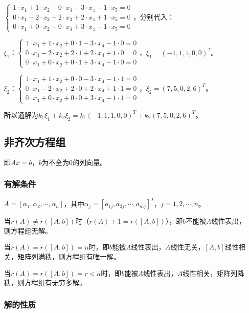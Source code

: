 \documentclass[UTF8, 12pt]{ctexart}
\begin{document}
$\left\{\begin{array}{l}
    1\cdot x_1+1\cdot x_2+0\cdot x_3-3\cdot x_4-1\cdot x_5=0 \\
    0\cdot x_1-2\cdot x_2+2\cdot x_3+2\cdot x_4+1\cdot x_5=0 \\
    0\cdot x_1+0\cdot x_2+0\cdot x_3+3\cdot x_4-1\cdot x_5=0
\end{array}\right.$，分别代入：

$\xi_1$：$\left\{\begin{array}{l}
    1\cdot x_1+1\cdot x_2+0\cdot1-3\cdot x_4-1\cdot0=0 \\
    0\cdot x_1-2\cdot x_2+2\cdot1+2\cdot x_4+1\cdot0=0 \\
    0\cdot x_1+0\cdot x_2+0\cdot1+3\cdot x_4-1\cdot0=0
\end{array}\right.$，$\xi_1=(-1,1,1,0,0)^T$。

$\xi_2$：$\left\{\begin{array}{l}
    1\cdot x_1+1\cdot x_2+0\cdot0-3\cdot x_4-1\cdot1=0 \\
    0\cdot x_1-2\cdot x_2+2\cdot0+2\cdot x_4+1\cdot1=0 \\
    0\cdot x_1+0\cdot x_2+0\cdot0+3\cdot x_4-1\cdot1=0
\end{array}\right.$，$\xi_2=(7,5,0,2,6)^T$。\medskip

所以通解为$k_1\xi_1+k_2\xi_2=k_1(-1,1,1,0,0)^T+k_2(7,5,0,2,6)^T$。

\subsection{非齐次方程组}

即$Ax=b$，$b$为不全为0的列向量。

\subsubsection{有解条件}

$A=[\alpha_1,\alpha_2,\cdots,\alpha_n]$，其中$\alpha_j=[a_{1j},a_{2j},\cdots,a_{mj}]^T$，$j=1,2,\cdots,n$。

当$r(A)\neq r([A,b])$时（$r(A)+1=r([A,b])$），即$b$不能被$A$线性表出，则方程组无解。

当$r(A)=r([A,b])=n$时，即$b$能被$A$线性表出，$A$线性无关，$[A,b]$线性相关，矩阵列满秩，则方程组有唯一解。

当$r(A)=r([A,b])=r<n$时，即$b$能被$A$线性表出，$A$线性相关，矩阵列降秩，则方程组有无穷多解。

\subsubsection{解的性质}
\end{document}
